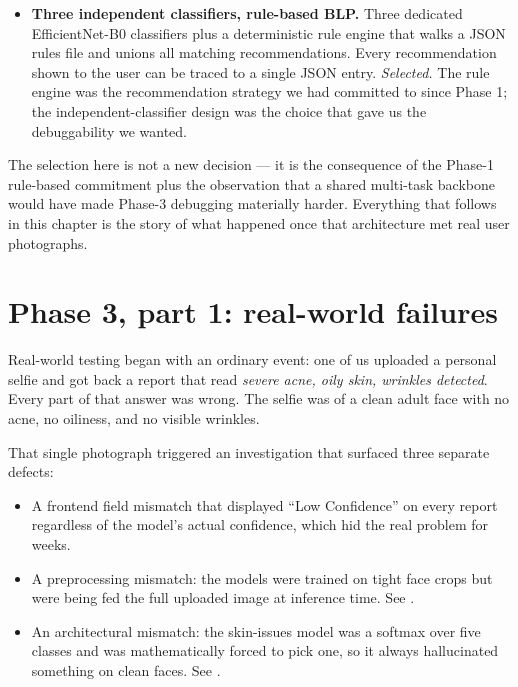 \documentclass[11pt,a4paper,oneside]{report}
\newcommand{\effnet}{EfficientNet-B0\xspace}
\begin{document}
\begin{itemize}
        a signal the MLP has nothing meaningful to train against,
        and any labels we could generate ourselves would just be
        a reflection of the rules we would have written by hand
        anyway --- with the added cost that the MLP would then
        obscure the trace from prediction to recommendation,
        breaking our Phase-1 explainability commitment.
    \item \textbf{Three independent classifiers, rule-based BLP.}
        Three dedicated \effnet classifiers plus a deterministic
        rule engine that walks a JSON rules file and unions all
        matching recommendations. Every recommendation shown to
        the user can be traced to a single JSON entry.
        \emph{Selected.} The rule engine was the recommendation
        strategy we had committed to since Phase 1; the
        independent-classifier design was the choice that gave us
        the debuggability we wanted.
\end{itemize}

The selection here is not a new decision --- it is the
consequence of the Phase-1 rule-based commitment plus the
observation that a shared multi-task backbone would have made
Phase-3 debugging materially harder. Everything that follows in
this chapter is the story of what happened once that
architecture met real user photographs.

\section{Phase 3, part 1: real-world failures}\label{sec:phase3-failures}

Real-world testing began with an ordinary event: one of us
uploaded a personal selfie and got back a report that read
\emph{severe acne, oily skin, wrinkles detected}. Every part of
that answer was wrong. The selfie was of a clean adult face with
no acne, no oiliness, and no visible wrinkles.

That single photograph triggered an investigation that surfaced
three separate defects:

\begin{itemize}
    \item A frontend field mismatch that displayed ``Low Confidence''
        on every report regardless of the model's actual confidence,
        which hid the real problem for weeks.
    \item A preprocessing mismatch: the models were trained on
        tight face crops but were being fed the full uploaded image
        at inference time. See .
    \item An architectural mismatch: the skin-issues model was a
        softmax over five classes and was mathematically forced to
        pick one, so it always hallucinated something on clean
        faces. See .
\end{itemize}
\end{document}
